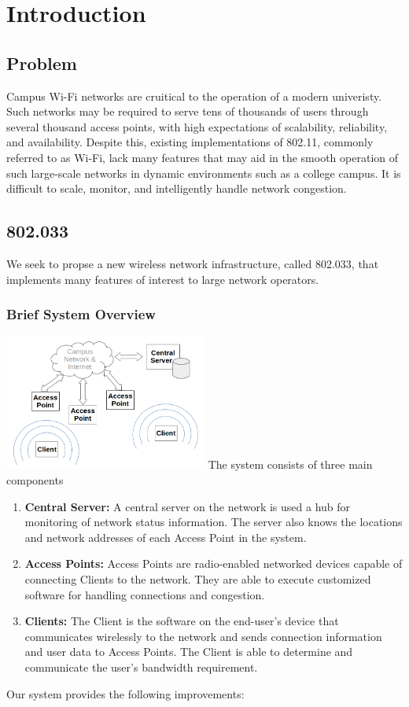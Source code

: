\documentclass[11pt,twocolumn]{article}
\begin{document}
\maketitle

\section{Introduction}
\subsection{Problem}
\indent Campus Wi-Fi networks are cruitical to the operation of a modern univeristy. Such networks may be required to serve tens of thousands of users
through several thousand access points, with high expectations of scalability, reliability, and availability. Despite this, existing 
implementations of 802.11, commonly referred to as Wi-Fi, lack many features that may aid in the smooth operation of such large-scale networks in dynamic 
environments such as a college campus. It is difficult to scale, monitor, and intelligently handle network congestion.
\subsection{802.033}
\indent We seek to propse a new wireless network infrastructure, called 802.033, that implements many features of interest to large network operators.
\subsubsection{Brief System Overview}
\includegraphics[width=0.5\textwidth]{overview}
\indent The system consists of three main components\\
\begin{enumerate}
	\item \textbf{Central Server:} A central server on the network is used a hub for monitoring of network status information. The server also knows
		the locations and network addresses of each Access Point in the system.
	\item \textbf{Access Points:} Access Points are radio-enabled networked devices capable of connecting Clients to the network. They are
		able to execute customized software for handling connections and congestion.
	\item \textbf{Clients:} The Client is the software on the end-user's device that communicates wirelessly to the network and sends connection information and
		user data to Access Points. The Client is able to determine and communicate the user's bandwidth requirement.
\end{enumerate}
\indent Our system provides the following improvements:\\
\end{document}
